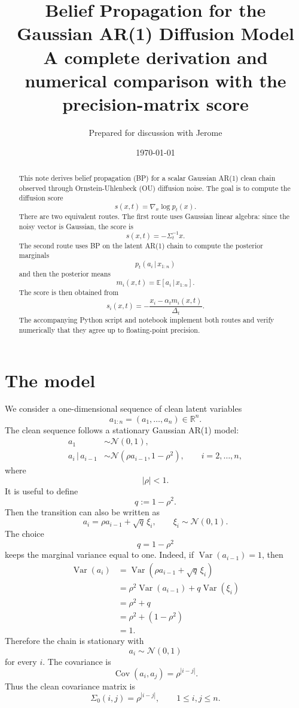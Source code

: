 \documentclass[11pt]{article}
\title{Belief Propagation for the Gaussian AR(1) Diffusion Model\\
\large A complete derivation and numerical comparison with the precision-matrix score}
\author{Prepared for discussion with Jerome}
\date{\today}
\newcommand{\R}{\mathbb{R}}
\newcommand{\E}{\mathbb{E}}
\newcommand{\N}{\mathcal{N}}
\newcommand{\Cov}{\operatorname{Cov}}
\newcommand{\given}{\,|\,}
\begin{document}
\maketitle

\begin{abstract}
This note derives belief propagation (BP) for a scalar Gaussian AR(1) clean chain observed through Ornstein-Uhlenbeck (OU) diffusion noise. The goal is to compute the diffusion score
\[
  s(x,t)=\nabla_x \log p_t(x).
\]
There are two equivalent routes. The first route uses Gaussian linear algebra: since the noisy vector is Gaussian, the score is
\[
  s(x,t)=-\Sigma_t^{-1}x.
\]
The second route uses BP on the latent AR(1) chain to compute the posterior marginals
\[
  p_t(a_i\given x_{1:n})
\]
and then the posterior means
\[
  m_i(x,t)=\E[a_i\given x_{1:n}].
\]
The score is then obtained from
\[
  s_i(x,t)=-\frac{x_i-\alpha_t m_i(x,t)}{\Delta_t}.
\]
The accompanying Python script and notebook implement both routes and verify numerically that they agree up to floating-point precision.
\end{abstract}

\tableofcontents

\section{The model}

We consider a one-dimensional sequence of clean latent variables
\[
  a_{1:n}=(a_1,\ldots,a_n)\in\R^n.
\]
The clean sequence follows a stationary Gaussian AR(1) model:
\begin{align}
  a_1 &\sim \N(0,1), \\
  a_i \given a_{i-1} &\sim \N(\rho a_{i-1},1-\rho^2), \qquad i=2,\ldots,n,
\end{align}
where
\[
  |\rho|<1.
\]
It is useful to define
\[
  q := 1-\rho^2.
\]
Then the transition can also be written as
\begin{equation}
  a_i = \rho a_{i-1}+\sqrt{q}\,\xi_i,
  \qquad \xi_i\sim \N(0,1).
\end{equation}
The choice
\[
  q=1-\rho^2
\]
keeps the marginal variance equal to one. Indeed, if \(\operatorname{Var}(a_{i-1})=1\), then
\begin{align}
  \operatorname{Var}(a_i)
  &= \operatorname{Var}(\rho a_{i-1}+\sqrt q\,\xi_i) \\
  &= \rho^2\operatorname{Var}(a_{i-1}) + q\operatorname{Var}(\xi_i) \\
  &= \rho^2 + q \\
  &= \rho^2 + (1-\rho^2) \\
  &= 1.
\end{align}
Therefore the chain is stationary with
\[
  a_i\sim \N(0,1)
\]
for every \(i\). The covariance is
\begin{equation}
  \Cov(a_i,a_j)=\rho^{|i-j|}.
\end{equation}
Thus the clean covariance matrix is
\begin{equation}
  \Sigma_0(i,j)=\rho^{|i-j|}, \qquad 1\le i,j\le n.
\end{equation}
\end{document}
